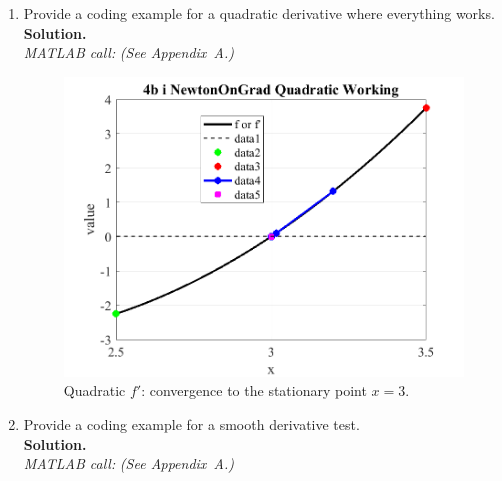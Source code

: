 \documentclass[11pt]{article}
\begin{document}
\begin{enumerate}[label=4(\alph*)]
		\item Provide a coding example for a quadratic derivative where everything works.\\
		\textbf{Solution.}\\
		\textit{MATLAB call:} \emph{(See Appendix~A.)}
		
		\begin{figure}[H]\centering
			\includegraphics[width=0.78\linewidth]{plots/4b_i_NewtonOnGrad_Quadratic_Working.png}
			\caption{Quadratic \(f'\): convergence to the stationary point \(x=3\).}
		\end{figure}
		
		\item Provide a coding example for a smooth derivative test.\\
		\textbf{Solution.}\\
		\textit{MATLAB call:} \emph{(See Appendix~A.)}
		

\end{enumerate}
\end{document}
